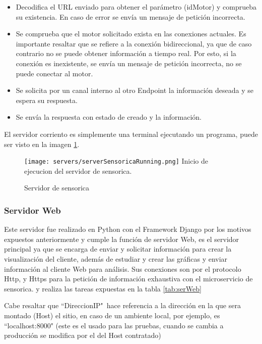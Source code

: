     \begin{itemize}
        \item Decodifica el URL enviado para obtener el parámetro (idMotor) y
            comprueba su existencia. En caso de error se envía un mensaje
            de petición incorrecta.
        \item Se comprueba que el motor solicitado exista en las conexiones
            actuales. Es importante resaltar que se refiere a la conexión
            bidireccional, ya que de caso contrario no se puede obtener información
            a tiempo real. Por esto, si la conexión es inexistente, se envía un
            mensaje de petición incorrecta, no se puede conectar al motor.
        \item Se solicita por un canal interno al otro Endpoint la información
            deseada y se espera su respuesta.
        \item Se envía la respuesta con estado de creado y la información.
    \end{itemize}

    El servidor corriento es simplemente una terminal ejecutando un programa,
    puede ser visto en la imagen \ref{img:serverSensoricaRunning}.

	\begin{figure}[htb]
		\centering
        \caption{Servidor de sensorica}
        \texttt{[image: servers/serverSensoricaRunning.png]}
        Inicio de ejecucion del servidor de sensorica.    \label{img:serverSensoricaRunning}
	\end{figure}

    \subsubsection{Servidor Web}
    Este servidor fue realizado en Python con el Framework Django
    por los motivos expuestos anteriormente y cumple la función de servidor Web,
    es el servidor principal ya que se encarga de enviar y solicitar información
    para crear la visualización del cliente, además de estudiar y crear las gráficas
    y enviar información al cliente Web para análisis.
    Sus conexiones son por el protocolo Http, y Https para la petición de información
    exhaustiva con el microservicio de sensorica. y realiza las tareas expuestas
    en la tabla \ref{tab:serWeb}

    Cabe resaltar que ``DireccionIP"\ hace referencia a la dirección en la
    que sera montado (Host) el sitio, en caso de un ambiente local, por
    ejemplo, es ``localhost:8000" (este es el usado para las pruebas,
    cuando se cambia a producción se modifica por el del Host contratado)

